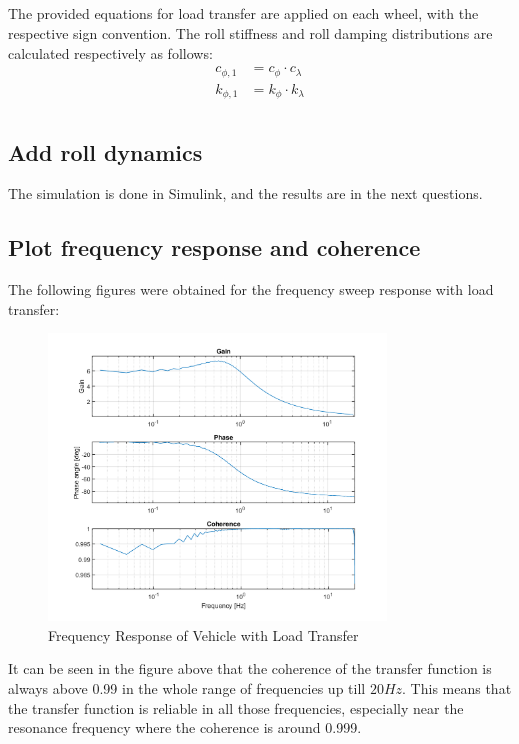 \subsection{}
The provided equations for load transfer are applied on each wheel, with the respective sign convention. The roll stiffness and roll damping distributions are calculated respectively as follows:
\begin{align*}
    c_{\phi,1} &= c_{\phi} \cdot c_{\lambda}\\
    k_{\phi,1} &= k_{\phi} \cdot k_{\lambda}\\
\end{align*}

\subsection{Add roll dynamics}
The simulation is done in Simulink, and the results are in the next questions.

\subsection{Plot frequency response and coherence}
The following figures were obtained for the frequency sweep response with load transfer:

\begin{figure}[H]
    \centering
    \includegraphics[width=0.8\textwidth]{Figures/2_3.png}
    \caption{Frequency Response of Vehicle with Load Transfer}
\end{figure}

It can be seen in the figure above that the coherence of the transfer function is always above 0.99 in the whole range of frequencies up till $20Hz$. This means that the transfer function is reliable in all those frequencies, especially near the resonance frequency where the coherence is around 0.999.


